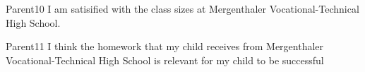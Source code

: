 \begin{question}{Parent10}
    \QuestionIndicative
    I am satisified with the class sizes at 
        Mergenthaler Vocational-Technical High School.
    \begin{choiceshoriz}[o]
    \end{choiceshoriz}
\end{question}

\begin{question}{Parent11}
    \QuestionIndicative
    I think the homework that my child receives from Mergenthaler Vocational-Technical High School is relevant for my child to be successful
    \begin{choiceshoriz}[o]
    \end{choiceshoriz}
\end{question}


\endinput



